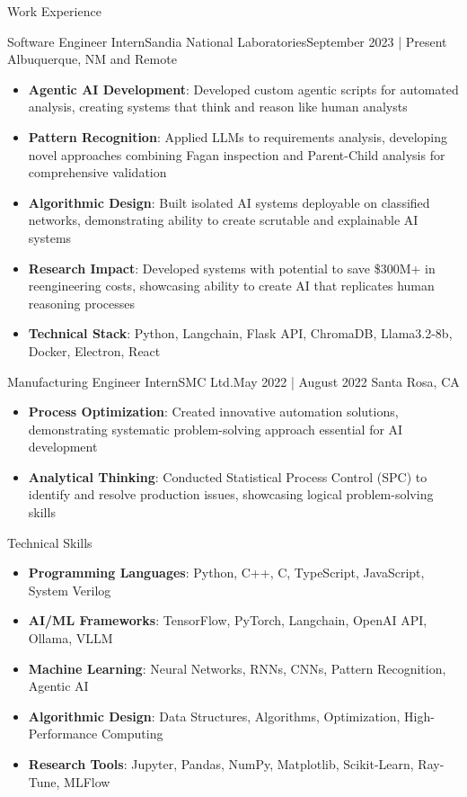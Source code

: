 \documentclass[]{mcdowellcv}
\begin{document}
\begin{cvsection}{Work Experience}
	\begin{cvsubsection}{Software Engineer Intern}{Sandia National Laboratories}{September 2023 | Present}
		Albuquerque, NM and Remote
		\begin{itemize}
			\item \textbf{Agentic AI Development}: Developed custom agentic scripts for automated analysis, creating systems that think and reason like human analysts
			\item \textbf{Pattern Recognition}: Applied LLMs to requirements analysis, developing novel approaches combining Fagan inspection and Parent-Child analysis for comprehensive validation
			\item \textbf{Algorithmic Design}: Built isolated AI systems deployable on classified networks, demonstrating ability to create scrutable and explainable AI systems
			\item \textbf{Research Impact}: Developed systems with potential to save \$300M+ in reengineering costs, showcasing ability to create AI that replicates human reasoning processes
			\item \textbf{Technical Stack}: Python, Langchain, Flask API, ChromaDB, Llama3.2-8b, Docker, Electron, React
		\end{itemize}
	\end{cvsubsection}
	\begin{cvsubsection}{Manufacturing Engineer Intern}{SMC Ltd.}{May 2022 | August 2022}
		Santa Rosa, CA
		\begin{itemize}
			\item \textbf{Process Optimization}: Created innovative automation solutions, demonstrating systematic problem-solving approach essential for AI development
			\item \textbf{Analytical Thinking}: Conducted Statistical Process Control (SPC) to identify and resolve production issues, showcasing logical problem-solving skills
		\end{itemize}
	\end{cvsubsection}
\end{cvsection}

\begin{cvsection}{Technical Skills}
	\begin{cvsubsection}{}{}{}
		\begin{itemize}
			\item \textbf{Programming Languages}: Python, C++, C, TypeScript, JavaScript, System Verilog
			\item \textbf{AI/ML Frameworks}: TensorFlow, PyTorch, Langchain, OpenAI API, Ollama, VLLM
			\item \textbf{Machine Learning}: Neural Networks, RNNs, CNNs, Pattern Recognition, Agentic AI
			\item \textbf{Algorithmic Design}: Data Structures, Algorithms, Optimization, High-Performance Computing
			\item \textbf{Research Tools}: Jupyter, Pandas, NumPy, Matplotlib, Scikit-Learn, Ray-Tune, MLFlow
		\end{itemize}
	\end{cvsubsection}
\end{cvsection}
\end{document}
